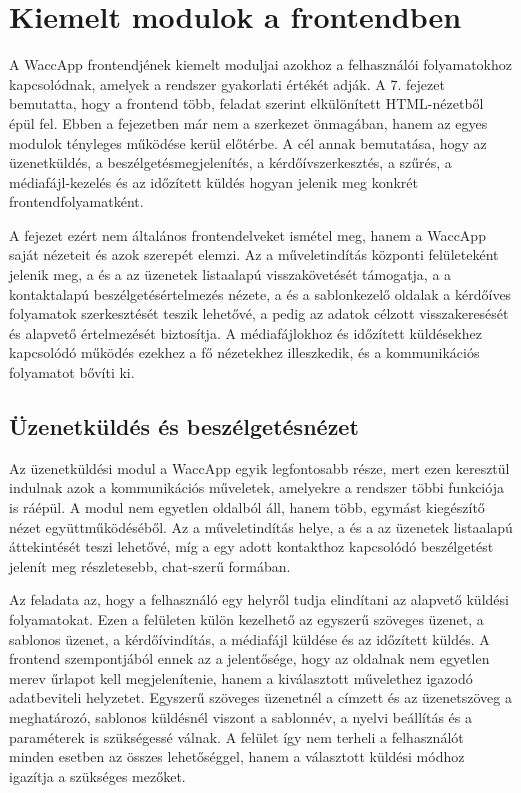 \chapter{Kiemelt modulok a frontendben}

A WaccApp frontendjének kiemelt moduljai azokhoz a felhasználói folyamatokhoz kapcsolódnak, amelyek a rendszer gyakorlati értékét adják. A 7. fejezet bemutatta, hogy a frontend több, feladat szerint elkülönített HTML-nézetből épül fel. Ebben a fejezetben már nem a szerkezet önmagában, hanem az egyes modulok tényleges működése kerül előtérbe. A cél annak bemutatása, hogy az üzenetküldés, a beszélgetésmegjelenítés, a kérdőívszerkesztés, a szűrés, a médiafájl-kezelés és az időzített küldés hogyan jelenik meg konkrét frontendfolyamatként. 

A fejezet ezért nem általános frontendelveket ismétel meg, hanem a WaccApp saját nézeteit és azok szerepét elemzi. Az  a műveletindítás központi felületeként jelenik meg, a  és a  az üzenetek listaalapú visszakövetését támogatja, a  a kontaktalapú beszélgetésértelmezés nézete, a  és a sablonkezelő oldalak a kérdőíves folyamatok szerkesztését teszik lehetővé, a  pedig az adatok célzott visszakeresését és alapvető értelmezését biztosítja. A médiafájlokhoz és időzített küldésekhez kapcsolódó működés ezekhez a fő nézetekhez illeszkedik, és a kommunikációs folyamatot bővíti ki. 

\section{Üzenetküldés és beszélgetésnézet}

Az üzenetküldési modul a WaccApp egyik legfontosabb része, mert ezen keresztül indulnak azok a kommunikációs műveletek, amelyekre a rendszer többi funkciója is ráépül. A modul nem egyetlen oldalból áll, hanem több, egymást kiegészítő nézet együttműködéséből. Az  a műveletindítás helye, a  és a  az üzenetek listaalapú áttekintését teszi lehetővé, míg a  egy adott kontakthoz kapcsolódó beszélgetést jelenít meg részletesebb, chat-szerű formában. 

Az  feladata az, hogy a felhasználó egy helyről tudja elindítani az alapvető küldési folyamatokat. Ezen a felületen külön kezelhető az egyszerű szöveges üzenet, a sablonos üzenet, a kérdőívindítás, a médiafájl küldése és az időzített küldés. A frontend szempontjából ennek az a jelentősége, hogy az oldalnak nem egyetlen merev űrlapot kell megjelenítenie, hanem a kiválasztott művelethez igazodó adatbeviteli helyzetet. Egyszerű szöveges üzenetnél a címzett és az üzenetszöveg a meghatározó, sablonos küldésnél viszont a sablonnév, a nyelvi beállítás és a paraméterek is szükségessé válnak. A felület így nem terheli a felhasználót minden esetben az összes lehetőséggel, hanem a választott küldési módhoz igazítja a szükséges mezőket.

